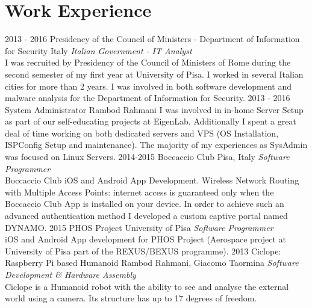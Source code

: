\documentclass[]{friggeri-cv} %
\begin{document}
\patchcmd{\entry}{14.8cm}{11.8cm}{}{}
\section{Work Experience}
\vspace{-3mm}
\begin{entrylist}
\entry
{2013 - 2016}
{Presidency of the Council of Ministers - Department of Information for Security}
{Italy}
{\emph{Italian Government - IT Analyst} \\
I was recruited by Presidency of the Council of Ministers of Rome during the second semester of my first year at University of Pisa. I worked in several Italian cities for more than 2 years. I was involved in both software development and malware analysis for the  Department of Information for Security.}
\entry
{2013 - 2016}
{System Administrator}
{Rambod Rahmani}
{I was involved in in-home Server Setup as part of our self-educating projects at EigenLab. Additionally I spent a great deal of time working on both dedicated servers and VPS (OS Installation, ISPConfig Setup and maintenance). The majority of my experiences as SysAdmin was focused on Linux Servers.}
\entry
{2014-2015}
{Boccaccio Club}
{Pisa, Italy}
{\emph{Software Programmer} \\
Boccaccio Club iOS and Android App Development. Wireless Network Routing with Multiple Access Points: internet access is guaranteed only when the Boccaccio Club App is installed on your device. In order to achieve such an advanced authentication method I developed a custom captive portal named DYNAMO.}
\entry
{2015}
{PHOS Project}
{University of Pisa}
{\emph{Software Programmer} \\
iOS and Android App development for PHOS Project (Aerospace project at University of Pisa part of the REXUS/BEXUS programme).}
\entry
{2013}
{Ciclope: Raspberry Pi based Humanoid}
{Rambod Rahmani, Giacomo Taormina}
{\emph{Software Development \& Hardware Assembly} \\
Ciclope is a Humanoid robot with the ability to see and analyse the external world using a camera. Its structure has up to 17 degrees of freedom.\\
}
\end{entrylist}
\end{document}
